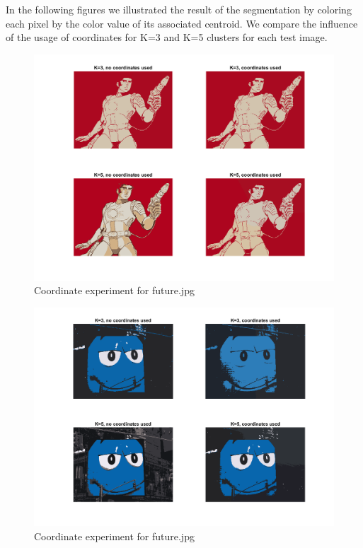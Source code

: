 In the following figures we illustrated the result of the segmentation by coloring each pixel by the color value of its associated centroid. We compare the influence of the usage of coordinates for K=3 and K=5 clusters for each test image.
\begin{figure}[h!]
\includegraphics[width = 0.9\linewidth]{figures/task2/future_coordinates.png}
\caption{Coordinate experiment for future.jpg}
\label{fig:future:coords}
\end{figure}
\begin{figure}
\includegraphics[width = 0.9\linewidth]{figures/task2/mm_coordinates.png}
\caption{Coordinate experiment for future.jpg}
\label{fig:mm:coords}
\end{figure}
